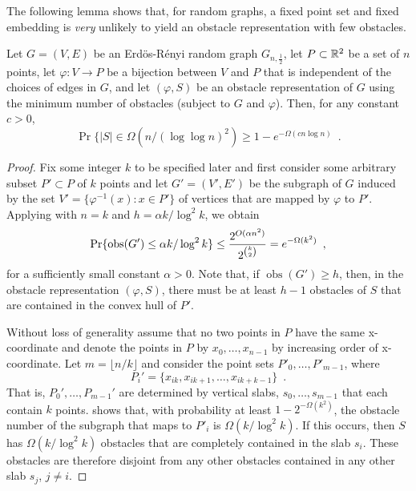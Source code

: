\documentclass{patmorin}
\DeclareMathOperator{\obs}{obs}
\begin{document}
The following lemma shows that, for random graphs, a fixed point
set and fixed embedding is \emph{very} unlikely to yield an obstacle
representation with few obstacles.

\begin{lem}
  Let $G=(V,E)$ be an Erd\"os-R\'enyi random graph $G_{n,\frac{1}{2}}$,
  let $P\subset\mathbb{R}^2$ be a set of $n$ points, let
  $\varphi:V\rightarrow P$ be a bijection between $V$ and $P$ that is
  independent of the choices of edges in $G$, and let $(\varphi, S)$ be
  an obstacle representation of $G$ using the minimum number of obstacles
  (subject to $G$ and $\varphi$).  Then, for any constant $c>0$,
  \[
     \Pr\{|S| \in \Omega(n/(\log\log n)^2) \ge 1-e^{-\Omega(cn\log n)}  \enspace .
  \] 
\end{lem}

\begin{proof}
Fix some integer $k$ to be specified later and first consider some
arbitrary subset $P'\subset P$ of $k$ points and let $G'=(V',E')$
be the subgraph of $G$ induced by the set $V'=\{\varphi^{-1}(x):x\in
P'\}$ of vertices that are mapped by $\varphi$ to $P'$.  Applying
 with $n=k$ and $h=\alpha k/\log^2 k$, we obtain
\begin{equation}
     \Pr\{\obs(G') \le \alpha k/\log^2 k\} 
       \le \frac{2^{O(\alpha n^2)}}{2^{\binom{k}{2}}}
       = e^{-\Omega(k^2)} \enspace , \eqlabel{g1}
\end{equation}
for a sufficiently small constant $\alpha > 0$.  Note that, if
$\obs(G')\ge h$, then, in the obstacle representation $(\varphi,S)$,
there must be at least $h-1$ obstacles of $S$ that are contained in the
convex hull of $P'$.

Without loss of generality assume that no two points in $P$ have the
same x-coordinate and denote the points in $P$ by $x_0,\ldots,x_{n-1}$
by increasing order of x-coordinate.  Let $m=\lfloor n/k\rfloor$ and
consider the point sets $P'_0,\ldots,P'_{m-1}$, where
\[ 
  P_i'=\{x_{ik},x_{ik+1},\ldots,x_{ik+k-1}\} \enspace .
\]  
That is, $P_0',\ldots,P_{m-1}'$ are determined by vertical slabs,
$s_0,\ldots,s_{m-1}$ that each contain $k$ points.   shows
that, with probability at least $1-2^{-\Omega(k^2)}$, the obstacle number
of the subgraph that maps to $P'_i$ is $\Omega(k/\log^2 k)$.  If this
occurs, then $S$ has $\Omega(k/\log^2 k)$ obstacles that are completely
contained in the slab $s_i$.  These obstacles are therefore disjoint
from any other obstacles contained in any other slab $s_j$, $j\neq i$.


\end{proof}
\end{document}
